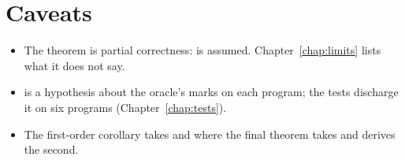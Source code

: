 \section*{Caveats}
\begin{itemize}
\item The theorem is partial correctness:  is assumed. Chapter~\ref{chap:limits} lists what it does not say.
\item {} is a hypothesis about the oracle's marks on each program; the tests discharge it on six programs (Chapter~\ref{chap:tests}).
\item The first-order corollary takes  and  where the final theorem takes  and derives the second.
\end{itemize}

